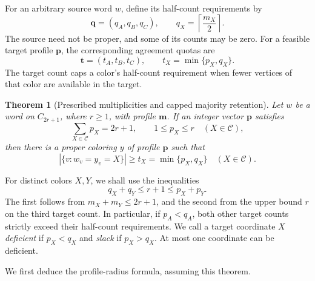 \documentclass[10pt,a4paper]{amsart}
\numberwithin{equation}{section}
\newtheorem{theorem}{Theorem}[section]
\theoremstyle{definition}
\theoremstyle{remark}
\begin{document}
For an arbitrary source word $w$, define its half-count requirements by
\[
\mathbf q=(q_A,q_B,q_C),
\qquad q_X=\left\lceil\frac{m_X}{2}\right\rceil.
\]
The source need not be proper, and some of its counts may be zero.
For a feasible target profile $\mathbf p$, the corresponding agreement
quotas are
\[
\mathbf t=(t_A,t_B,t_C),\qquad t_X=\min\{p_X,q_X\}.
\]
The target count caps a color's half-count requirement when fewer
vertices of that color are available in the target.

\begin{theorem}[Prescribed multiplicities and capped majority retention]
\label{odd:quota}\label{odd:capped}
Let $w$ be a word on $C_{2r+1}$, where $r\ge1$, with profile
$\mathbf m$. If an integer vector $\mathbf p$ satisfies
\begin{equation}\label{odd:target}
\sum_{X\in\mathcal C}p_X=2r+1,
\qquad 1\le p_X\le r
\quad(X\in\mathcal C),
\end{equation}
then there is a proper coloring $y$ of profile $\mathbf p$ such that
\begin{equation}\label{odd:agreements}
|\{v:w_v=y_v=X\}|\ge t_X=\min\{p_X,q_X\}
\quad(X\in\mathcal C).
\end{equation}
\end{theorem}

For distinct colors $X,Y$, we shall use the inequalities
\begin{equation}\label{odd:pair-quota}
q_X+q_Y\le r+1\le p_X+p_Y.
\end{equation}
The first follows from $m_X+m_Y\le2r+1$, and the second from the
upper bound $r$ on the third target count. In particular, if
$p_A<q_A$, both other target counts strictly exceed their half-count
requirements. We call a target coordinate $X$ \emph{deficient} if
$p_X<q_X$ and \emph{slack} if $p_X>q_X$.
At most one coordinate can be deficient.

We first deduce the profile-radius formula, assuming this theorem.
\end{document}
